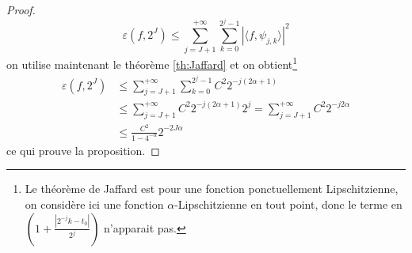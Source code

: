 \begin{proof}
	\begin{equation*}
		\varepsilon(f, 2^J) \leq \sum_{j=J+1}^{+\infty} \sum_{k=0}^{2^j -1} |\langle f, \psi_{j,k} \rangle|^2
	\end{equation*}
	on utilise maintenant le théorème \ref{th:Jaffard} et on obtient\footnote{Le théorème de Jaffard est pour une fonction ponctuellement Lipschitzienne, on considère ici une fonction $\alpha$-Lipschitzienne en tout point, donc le terme en $(1 + \frac{|2^{-j}k -t_0|}{2^j})$ n'apparait pas.}
	\begin{align*}
		\varepsilon(f, 2^J) &\leq \sum_{j=J+1}^{+\infty} \sum_{k=0}^{2^j -1} C^2 2^{-j(2\alpha + 1)} \\
		&\leq \sum_{j=J+1}^{+\infty} C^2 2^{-j(2\alpha + 1)} 2^{j} = \sum_{j=J+1}^{+\infty} C^2 2^{-j2\alpha} \\
		&\leq \frac{C^2}{1 - 4^{-\alpha}} 2^{-2J\alpha}	
	\end{align*}
	ce qui prouve la proposition.
\end{proof}
